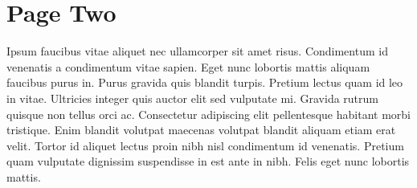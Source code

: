 \chapter{Page Two}

Ipsum faucibus vitae aliquet nec ullamcorper sit amet risus. Condimentum id venenatis a condimentum vitae sapien. Eget nunc lobortis mattis aliquam faucibus purus in. Purus gravida quis blandit turpis. Pretium lectus quam id leo in vitae. Ultricies integer quis auctor elit sed vulputate mi. Gravida rutrum quisque non tellus orci ac. Consectetur adipiscing elit pellentesque habitant morbi tristique. Enim blandit volutpat maecenas volutpat blandit aliquam etiam erat velit. Tortor id aliquet lectus proin nibh nisl condimentum id venenatis. Pretium quam vulputate dignissim suspendisse in est ante in nibh. Felis eget nunc lobortis mattis.